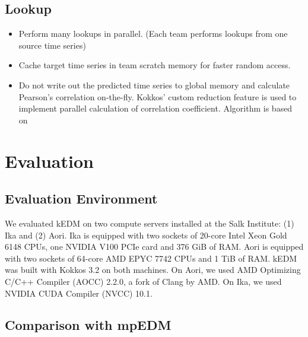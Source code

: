 \documentclass[conference]{IEEEtran}
\begin{document}
\subsection{Lookup}

\begin{itemize}
\item Perform many lookups in parallel. (Each team performs lookups from one
    source time series)
\item Cache target time series in team scratch memory for faster random
    access.
\item Do not write out the predicted time series to global memory and
    calculate Pearson’s correlation on-the-fly. Kokkos’ custom reduction
    feature is used to implement parallel calculation of correlation
    coefficient. Algorithm is based on~\cite{Schubert2018}
\end{itemize}

\section{Evaluation}

\subsection{Evaluation Environment}


We evaluated kEDM on two compute servers installed at the Salk Institute: (1)
Ika and (2) Aori.
Ika is equipped with two sockets of 20-core Intel Xeon Gold 6148 CPUs, one
NVIDIA V100 PCIe card and 376 GiB of RAM. Aori is equipped with two sockets of
64-core AMD EPYC 7742 CPUs and 1 TiB of RAM.
kEDM was built with Kokkos 3.2 on both machines. On Aori, we used AMD
Optimizing C/C++ Compiler (AOCC) 2.2.0, a fork of Clang by AMD. On Ika, we
used NVIDIA CUDA Compiler (NVCC) 10.1.

\subsection{Comparison with mpEDM}
\end{document}
